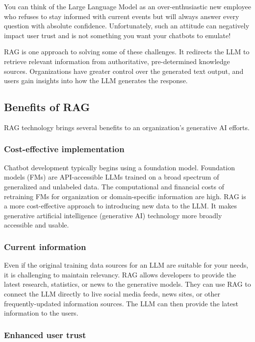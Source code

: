 You can think of the Large Language Model as an over-enthusiastic new employee who refuses to stay 
informed with current events but will always answer every question with absolute confidence. Unfortunately, 
such an attitude can negatively impact user trust and is not something you want your chatbots to emulate!

RAG is one approach to solving some of these challenges. It redirects the LLM to retrieve relevant 
information from authoritative, pre-determined knowledge sources. Organizations have greater control 
over the generated text output, and users gain insights into how the LLM generates the response.


\subsection{Benefits of RAG}

RAG technology brings several benefits to an organization's generative AI efforts.

\subsubsection{Cost-effective implementation}

Chatbot development typically begins using a foundation model. Foundation models (FMs) are API-accessible 
LLMs trained on a broad spectrum of generalized and unlabeled data. The computational and financial 
costs of retraining FMs for organization or domain-specific information are high. RAG is a more cost-effective 
approach to introducing new data to the LLM. It makes generative artificial intelligence (generative 
AI) technology more broadly accessible and usable.

\subsubsection{Current information}

Even if the original training data sources for an LLM are suitable for your needs, it is challenging 
to maintain relevancy. RAG allows developers to provide the latest research, statistics, or news to 
the generative models. They can use RAG to connect the LLM directly to live social media feeds, news 
sites, or other frequently-updated information sources. The LLM can then provide the latest information 
to the users.

\subsubsection{Enhanced user trust}

